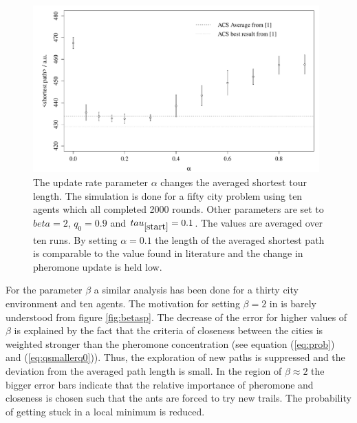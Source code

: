 \begin{figure}[h!]
\begin{center}
\includegraphics[width=11cm, height= 6 cm]{alpha_vs_shortestpath}
\caption{The update rate parameter $\alpha$ changes the averaged shortest tour length. The simulation is done for a fifty city problem using ten agents which all completed 2000 rounds. Other parameters are set to $beta=2$, $q_0=0.9$ and $tau_{\ref{start}}=0.1$. The values are averaged over ten runs. By setting $\alpha=0.1$ the length of the averaged shortest path is comparable to the value found in literature \cite{paper} and the change in pheromone update is held low.}
\label{fig:alphasp}
\end{center}
\end{figure}

For the parameter $\beta$ a similar analysis has been done for a thirty city environment and ten agents. The motivation for setting $\beta=2$ in \cite{paper} is barely understood from figure \ref{fig:betasp}. The decrease of the error for higher values of $\beta$ is explained by the fact that the criteria of closeness between the cities is weighted stronger than the pheromone concentration (see equation (\ref{eq:prob}) and (\ref{eq:qsmallerq0})). Thus, the exploration of new paths is suppressed and the deviation from the averaged path length is small. In the region of $\beta\approx2$ the bigger error bars indicate that the relative importance of pheromone and closeness is chosen such that the ants are forced to try new trails. The probability of getting stuck in a local minimum is reduced.

